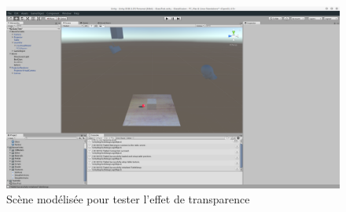 \begin{figure}[H]
\centering
\includegraphics[width=0.75\linewidth, trim = 12cm 12cm 20cm 4.5cm, clip]{images/Unity-Projection-RealScene}
\caption{Scène modélisée pour tester l'effet de transparence}
\label{fig:unity:projscene}
\end{figure}

